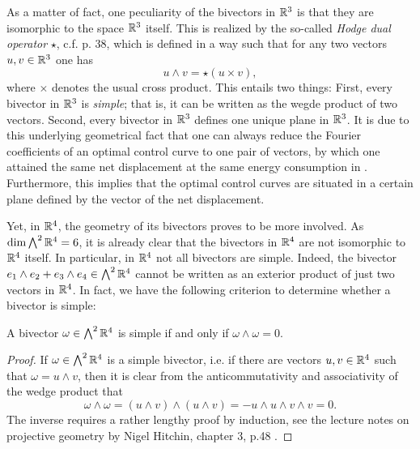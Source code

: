 As a matter of fact, one peculiarity of the bivectors in $\mathbb{R}^3$ is that they are isomorphic to the space $\mathbb{R}^3$ itself. This is realized by the so-called \emph{Hodge dual operator} $\star$, c.f. \cite{Lounesto2006} p. 38, which is defined in a way such that for any two vectors $u,v \in \mathbb{R}^3$ one has
\begin{equation}
\label{eq: hodge star}
u \wedge v = \star(u \times v),
\end{equation}
where $\times$ denotes the usual cross product. This entails two things: First, every bivector in $\mathbb{R}^3$ is \emph{simple}; that is, it can be written as the wegde product of two vectors. Second, every bivector in $\mathbb{R}^3$ defines one unique plane in $\mathbb{R}^3$. It is due to this underlying geometrical fact that one can always reduce the Fourier coefficients of an optimal control curve to one pair of vectors, by which one attained the same net displacement at the same energy consumption in \cite{Alouges2017}. Furthermore, this implies that the optimal control curves are situated in a certain plane defined by the vector of the net displacement.

Yet, in $\mathbb{R}^4$, the geometry of its bivectors proves to be more involved. As $\dim \bigwedge^2 \mathbb{R}^4 = 6$, it is already clear that the bivectors in $\mathbb{R}^4$ are not isomorphic to $\mathbb{R}^4$ itself. In particular, in $\mathbb{R}^4$ not all bivectors are simple. Indeed, the bivector $e_1 \wedge e_2 + e_3 \wedge e_4 \in \bigwedge^2 \mathbb{R}^4$ cannot be written as an exterior product of just two vectors in $\mathbb{R}^4$. In fact, we have the following criterion to determine whether a bivector is simple:

\begin{lemma}
\label{lem:simple bivector}
A bivector $\omega \in \bigwedge^2 \mathbb{R}^4$ is simple if and only if $\omega \wedge \omega = 0$.
\end{lemma}

\begin{proof}
If $\omega \in \bigwedge^2 \mathbb{R}^4$ is a simple bivector, i.e. if there are vectors $u,v \in \mathbb{R}^4$ such that $\omega = u \wedge v$, then it is clear from the anticommutativity and associativity of the wedge product that
\begin{equation}
\omega \wedge \omega = (u \wedge v) \wedge (u \wedge v) = - u \wedge u \wedge v \wedge v = 0.
\end{equation}
The inverse requires a rather lengthy proof by induction, see the lecture notes on projective geometry by Nigel Hitchin, chapter 3, p.48 \cite{Hitchin2003}.
\end{proof}


